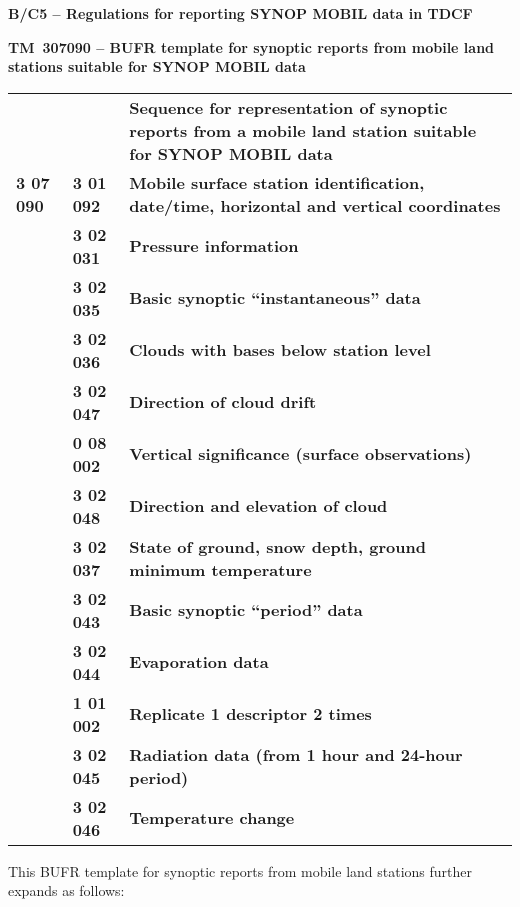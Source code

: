 \textbf{B/C5 -- Regulations for reporting SYNOP MOBIL data in TDCF}

\textbf{TM~307090 -- BUFR template for synoptic reports from mobile land stations suitable for SYNOP MOBIL data}

\begin{longtable}[]{@{}lll@{}}
\toprule
\endhead
& & \textbf{Sequence for representation of synoptic reports from a mobile land station suitable for SYNOP MOBIL data}\tabularnewline
\textbf{3 07 090} & \textbf{3 01 092} & \textbf{Mobile surface station identification, date/time, horizontal and vertical coordinates}\tabularnewline
& \textbf{3 02 031} & \textbf{Pressure information}\tabularnewline
& \textbf{3 02 035} & \textbf{Basic synoptic ``instantaneous'' data}\tabularnewline
& \textbf{3 02 036} & \textbf{Clouds with bases below station level}\tabularnewline
& \textbf{3 02 047} & \textbf{Direction of cloud drift}\tabularnewline
& \textbf{0 08 002} & \textbf{Vertical significance (surface observations)}\tabularnewline
& \textbf{3 02 048} & \textbf{Direction and elevation of cloud}\tabularnewline
& \textbf{3 02 037} & \textbf{State of ground, snow depth, ground minimum temperature}\tabularnewline
& \textbf{3 02 043} & \textbf{Basic synoptic ``period'' data}\tabularnewline
& \textbf{3 02 044} & \textbf{Evaporation data}\tabularnewline
& \textbf{1 01 002} & \textbf{Replicate 1 descriptor 2 times}\tabularnewline
& \textbf{3 02 045} & \textbf{Radiation data (from 1 hour and 24-hour period)}\tabularnewline
& \textbf{3 02 046} & \textbf{Temperature change}\tabularnewline
\bottomrule
\end{longtable}

This BUFR template for synoptic reports from mobile land stations further expands as follows:


